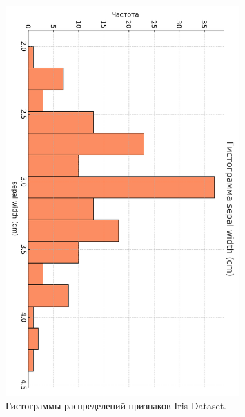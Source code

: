 \begin{figure}[H]
  \includegraphics[width=0.8\textwidth]{images/histo_sepal_width_cm_cb2.png}
  \caption{Гистограммы распределений признаков Iris Dataset.}
  \label{fig:iris_histos}
\end{figure}

